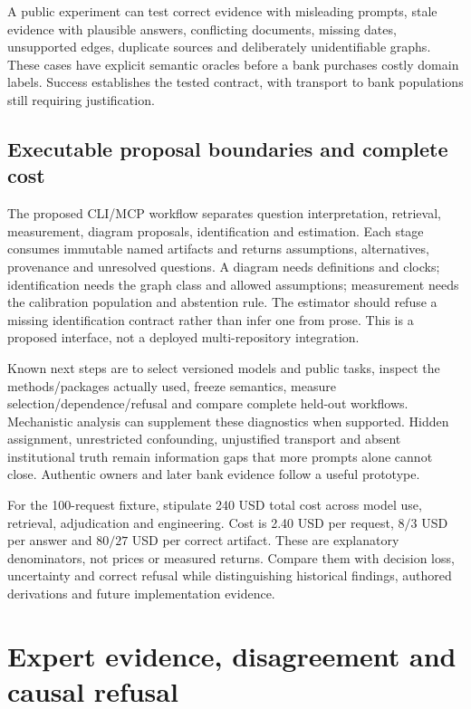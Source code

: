 A public experiment can test correct evidence with misleading prompts, stale evidence with plausible answers, conflicting documents, missing dates, unsupported edges, duplicate sources and deliberately unidentifiable graphs. These cases have explicit semantic oracles before a bank purchases costly domain labels. Success establishes the tested contract, with transport to bank populations still requiring justification.~\citep{exec24_css_knowledge_reference}

\subsection{Executable proposal boundaries and complete cost}
The proposed CLI/MCP workflow separates question interpretation, retrieval, measurement, diagram proposals, identification and estimation. Each stage consumes immutable named artifacts and returns assumptions, alternatives, provenance and unresolved questions. A diagram needs definitions and clocks; identification needs the graph class and allowed assumptions; measurement needs the calibration population and abstention rule. The estimator should refuse a missing identification contract rather than infer one from prose. This is a proposed interface, not a deployed multi-repository integration.~\citep{exec24_css_knowledge_reference}

Known next steps are to select versioned models and public tasks, inspect the methods/packages actually used, freeze semantics, measure selection/dependence/refusal and compare complete held-out workflows. Mechanistic analysis can supplement these diagnostics when supported. Hidden assignment, unrestricted confounding, unjustified transport and absent institutional truth remain information gaps that more prompts alone cannot close. Authentic owners and later bank evidence follow a useful prototype.~\citep{exec24_css_knowledge_reference}

For the 100-request fixture, stipulate 240 USD total cost across model use, retrieval, adjudication and engineering. Cost is 2.40 USD per request, $8/3$ USD per answer and $80/27$ USD per correct artifact. These are explanatory denominators, not prices or measured returns. Compare them with decision loss, uncertainty and correct refusal while distinguishing historical findings, authored derivations and future implementation evidence.~\citep{exec24_css_knowledge_reference}


\hypertarget{expert-evidence-disagreement-and-causal-refusal}{%
\section{Expert evidence, disagreement and causal
refusal}\label{expert-evidence-disagreement-and-causal-refusal}}

